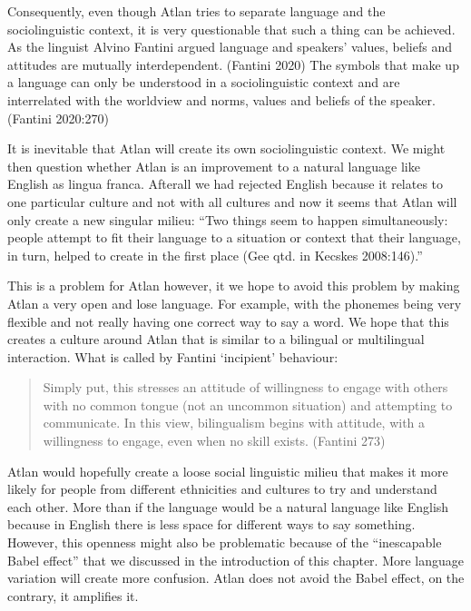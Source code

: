 Consequently, even though Atlan tries to separate language and the sociolinguistic context, it is very questionable that such a thing can be achieved. As the linguist Alvino Fantini argued language and speakers' values, beliefs and attitudes are mutually interdependent. (Fantini 2020) The symbols that make up a language can only be understood in a sociolinguistic context and are interrelated with the worldview and norms, values and beliefs of the speaker. (Fantini 2020:270)		

It is inevitable that Atlan will create its own sociolinguistic context. We might then question whether Atlan is an improvement to a natural language like English as lingua franca. Afterall we had rejected English because it relates to one particular culture and not with all cultures and now it seems that Atlan will only create a new singular milieu: “Two things seem to happen simultaneously: people attempt to fit their language to a situation or context that their language, in turn, helped to create in the first place (Gee qtd. in Kecskes 2008:146).”  				 

This is a problem for Atlan however, it we hope to avoid this problem by making Atlan a very open and lose language. For example, with the phonemes being very flexible and not really having one correct way to say a word. We hope that this creates a culture around  Atlan that is similar to a bilingual or multilingual interaction. What is called by Fantini ‘incipient’ behaviour: 

\begin{quote} 

Simply put, this stresses an attitude of willingness to 	engage with others with no common tongue (not an		uncommon situation) and attempting to communicate. In 	this view, bilingualism begins with attitude, with a 		willingness to engage, even when no skill exists.	(Fantini 273)  

\end{quote} 

Atlan would hopefully create a loose social linguistic milieu that makes it more likely for people from different ethnicities and cultures to try and understand each other. More than if the language would be a natural language like English because in English there is less space for different ways to say something. However, this openness might also be problematic because of the “inescapable Babel effect” that we discussed in the introduction of this chapter. More language variation will create more confusion. Atlan does not avoid the Babel effect, on the contrary, it amplifies it.

